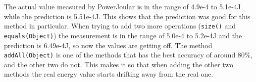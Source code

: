 

The actual value measured by PowerJoular is in the range of 4.9e-4 to 5.1e-4J while the prediction is 5.51e-4J. This shows that the prediction was good for this method in particular.
When trying to add two more operations (\texttt{size()} and \texttt{equals(Object)}) the measurement is in the range of 5.0e-4 to 5.2e-4J and the prediction is 6.49e-4J, so now the values are getting off. The method \texttt{addAll(Object)} is one of the methods that has the best accuracy of around 80\%, and the other two do not. This makes it so that when adding the other two methods the real energy value starts drifting away from the real one.

